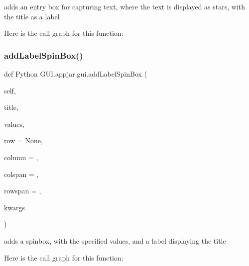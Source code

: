 \begin{DoxyVerb}adds an entry box for capturing text, where the text is displayed as stars, with the title as a label \end{DoxyVerb}
 Here is the call graph for this function\+:
\mbox{\label{class_python_01_g_u_i_1_1appjar_1_1gui_a9da6074d7b4fa3a79ec0f0af88e7a0a0}} 
\subsubsection{\texorpdfstring{add\+Label\+Spin\+Box()}{addLabelSpinBox()}}
{\footnotesize\ttfamily def Python G\+U\+I.\+appjar.\+gui.\+add\+Label\+Spin\+Box (\begin{DoxyParamCaption}\item[{}]{self,  }\item[{}]{title,  }\item[{}]{values,  }\item[{}]{row = {\ttfamily None},  }\item[{}]{column = {},  }\item[{}]{colspan = {},  }\item[{}]{rowspan = {},  }\item[{}]{kwargs }\end{DoxyParamCaption})}

\begin{DoxyVerb}adds a spinbox, with the specified values, and a label displaying the title \end{DoxyVerb}
 Here is the call graph for this function\+:
\mbox{\label{class_python_01_g_u_i_1_1appjar_1_1gui_af5311ecb5bf0981d5abf2a53e40f188d}} 
